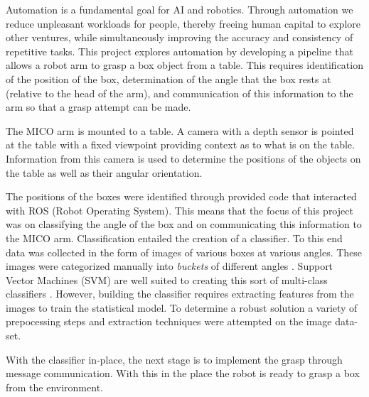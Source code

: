 \documentclass[letterpaper, 10 pt, conference]{conf/ieeeconf}  %
\begin{document}
Automation is a fundamental goal for AI and robotics. Through automation we
reduce unpleasant workloads for people, thereby freeing human capital to explore
other ventures, while simultaneously improving the accuracy and consistency of
repetitive tasks. This project explores automation by developing a pipeline that
allows a robot arm to grasp a box object from a table. This requires
identification of the position of the box, determination of the angle that the
box rests at (relative to the head of the arm), and communication of this
information to the arm so that a grasp attempt can be made.

The MICO arm is mounted to a table. A camera with a depth sensor is pointed at
the table with a fixed viewpoint providing context as to what is on the table.
Information from this camera is used to determine the positions of the objects
on the table as well as their angular orientation.

The positions of the boxes were identified through provided code that interacted
with ROS (Robot Operating System). This means that the focus of this project was
on classifying the angle of the box and on communicating this information to the
MICO arm. Classification entailed the creation of a classifier. To this end data
was collected in the form of images of various boxes at various angles. These
images were categorized manually into \textit{buckets} of different angles .
Support Vector Machines (SVM) are well suited to creating this sort of
multi-class classifiers \cite{Hsu2015}. However, building the classifier
requires extracting features from the images to train the statistical model. To
determine a robust solution a variety of prepocessing steps and extraction
techniques were attempted on the image data-set.

With the classifier in-place, the next stage is to implement the grasp
through message communication. With this in the place the robot is ready to
grasp a box from the environment.
\end{document}
